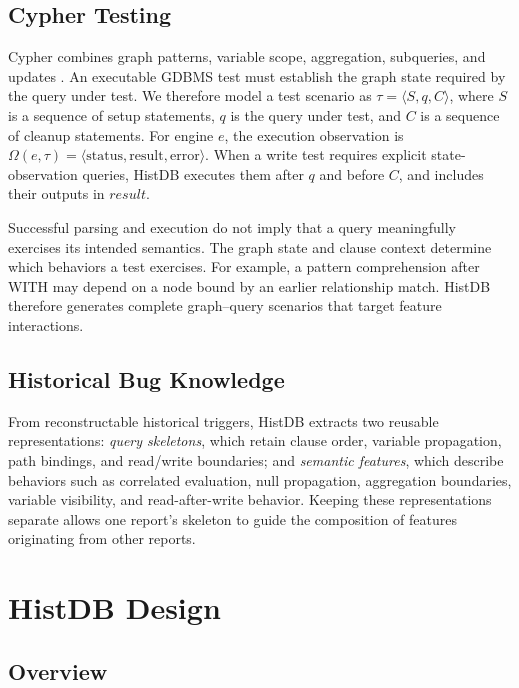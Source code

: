 \documentclass[acmsmall,screen,anonymous]{acmart}
\begin{document}
\subsection{Cypher Testing}

Cypher combines graph patterns, variable scope, aggregation, subqueries, and updates \cite{ref1,ref9,ref10,refCypherManual}. An executable GDBMS test must establish the graph state required by the query under test. We therefore model a test scenario as
$\tau=\langle S,q,C\rangle$, where $S$ is a sequence of setup statements, $q$ is the query under test, and $C$ is a sequence of cleanup statements. For engine $e$, the execution observation is $\Omega(e,\tau)=\langle\mathrm{status},\mathrm{result},\mathrm{error}\rangle$. When a write test requires explicit state-observation queries, HistDB executes them after $q$ and before $C$, and includes their outputs in $result$.

Successful parsing and execution do not imply that a query meaningfully exercises its intended semantics. The graph state and clause context determine which behaviors a test exercises. For example, a pattern comprehension after WITH may depend on a node bound by an earlier relationship match. HistDB therefore generates complete graph--query scenarios that target feature interactions.

\subsection{Historical Bug Knowledge}

From reconstructable historical triggers, HistDB extracts two reusable representations: \emph{query skeletons}, which retain clause order, variable propagation, path bindings, and read/write boundaries; and \emph{semantic features}, which describe behaviors such as correlated evaluation, null propagation, aggregation boundaries, variable visibility, and read-after-write behavior. Keeping these representations separate allows one report's skeleton to guide the composition of features originating from other reports.

\section{HistDB Design}
\label{sec:approach}

\subsection{Overview}
\label{sec:overview}
\end{document}
